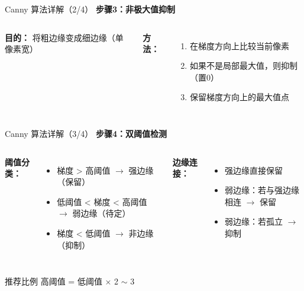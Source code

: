 \begin{frame}{Canny 算法详解（2/4）}
    \textbf{步骤3：非极大值抑制}

    \begin{columns}
        \textbf{目的：} 将粗边缘变成细边缘（单像素宽）

        \vspace{0.2cm}

        \textbf{方法：}
        \begin{enumerate}
            \item 在梯度方向上比较当前像素
            \item 如果不是局部最大值，则抑制（置0）
            \item 保留梯度方向上的最大值点
        \end{enumerate}

        \centering
    \end{columns}
\end{frame}

\begin{frame}{Canny 算法详解（3/4）}
    \textbf{步骤4：双阈值检测}

    \begin{columns}
        \textbf{阈值分类：}
        \begin{itemize}
            \item 梯度 > 高阈值 $\rightarrow$ 强边缘（保留）
            \item 低阈值 < 梯度 < 高阈值 $\rightarrow$ 弱边缘（待定）
            \item 梯度 < 低阈值 $\rightarrow$ 非边缘（抑制）
        \end{itemize}

        \textbf{边缘连接：}
        \begin{itemize}
            \item 强边缘直接保留
            \item 弱边缘：若与强边缘相连 $\rightarrow$ 保留
            \item 弱边缘：若孤立 $\rightarrow$ 抑制
        \end{itemize}
    \end{columns}

    \pause
    \vspace{0.3cm}

    \begin{uncoverenv}
        \begin{block}{推荐比例}
            高阈值 = 低阈值 × 2 $\sim$ 3
        \end{block}
    \end{uncoverenv}
\end{frame}

